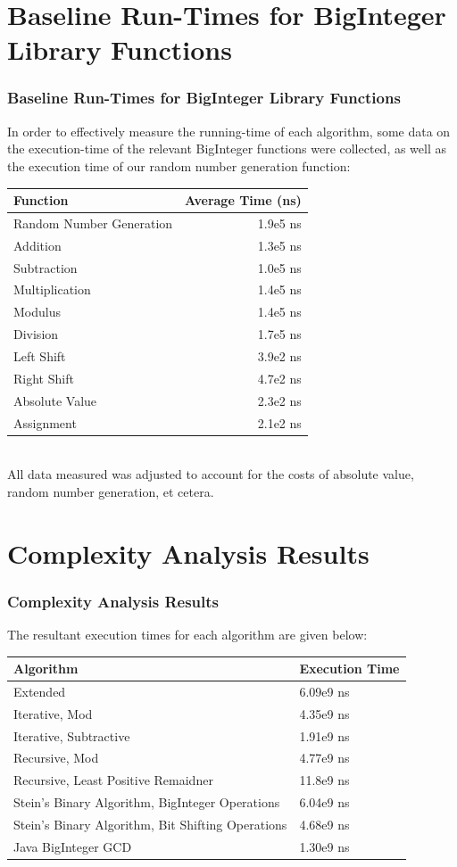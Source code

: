 \documentclass[8pt]{beamer}
\begin{document}
\section{Baseline Run-Times for BigInteger Library Functions}
\begin{frame}
\frametitle{Baseline Run-Times for BigInteger Library Functions}
\indent In order to effectively measure the running-time of each algorithm, some data on the execution-time of the relevant BigInteger functions were collected, as well as the execution time of our random number generation function: \\
\begin{tabular}{|l|r|}
\hline
Function & Average Time (ns) \\ \hline
Random Number Generation & 1.9e5 ns \\ \hline
Addition & 1.3e5 ns \\ \hline
Subtraction & 1.0e5 ns \\ \hline
Multiplication & 1.4e5 ns \\ \hline
Modulus & 1.4e5 ns \\ \hline
Division & 1.7e5 ns \\ \hline
Left Shift & 3.9e2 ns \\ \hline
Right Shift & 4.7e2 ns \\ \hline
Absolute Value & 2.3e2 ns \\ \hline
Assignment & 2.1e2 ns \\ \hline

\end{tabular}
\\ \indent All data measured was adjusted to account for the costs of absolute value, random number generation, et cetera.
\end{frame}
\section{Complexity Analysis Results}
\begin{frame}
\frametitle{Complexity Analysis Results}
The resultant execution times for each algorithm are given below:

\begin{tabular}{|l|l|}
\hline
	\textbf{Algorithm} & \textbf{Execution Time}
	\\
	\hline Extended & 6.09e9 ns\\
	\hline Iterative, Mod & 4.35e9 ns\\
	\hline Iterative, Subtractive & 1.91e9 ns\\
	\hline Recursive, Mod & 4.77e9 ns\\
	\hline Recursive, Least Positive Remaidner
 & 11.8e9 ns\\
	\hline Stein’s Binary Algorithm, BigInteger Operations & 6.04e9 ns\\
	\hline Stein’s Binary Algorithm, Bit Shifting Operations & 4.68e9 ns\\
	\hline Java BigInteger GCD & 1.30e9 ns\\
	\hline
\end{tabular}

\end{frame}
\end{document}
